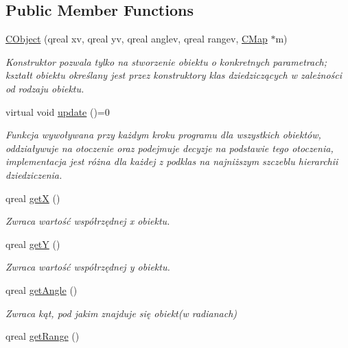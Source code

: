 \subsection*{Public Member Functions}
\begin{DoxyCompactItemize}
\item 
\mbox{\hyperlink{class_c_object_ab8bac765156b93002423cd43e853611f}{C\+Object}} (qreal xv, qreal yv, qreal anglev, qreal rangev, \mbox{\hyperlink{class_c_map}{C\+Map}} $\ast$m)
\begin{DoxyCompactList}\small\item\em Konstruktor pozwala tylko na stworzenie obiektu o konkretnych parametrach; kształt obiektu określany jest przez konstruktory klas dziedziczących w zależności od rodzaju obiektu. \end{DoxyCompactList}\item 
virtual void \mbox{\hyperlink{class_c_object_acb42ca516e836d0267ddb9a0556916a9}{update}} ()=0
\begin{DoxyCompactList}\small\item\em Funkcja wywoływana przy każdym kroku programu dla wszystkich obiektów, oddziaływuje na otoczenie oraz podejmuje decyzje na podstawie tego otoczenia, implementacja jest różna dla każdej z podklas na najniższym szczeblu hierarchii dziedziczenia. \end{DoxyCompactList}\item 
qreal \mbox{\hyperlink{class_c_object_a9199c97746518fd8eb029033d7539fbb}{getX}} ()
\begin{DoxyCompactList}\small\item\em Zwraca wartość współrzędnej x obiektu. \end{DoxyCompactList}\item 
qreal \mbox{\hyperlink{class_c_object_ac9ce72541d4420b65ec5abf7478f6e62}{getY}} ()
\begin{DoxyCompactList}\small\item\em Zwraca wartość współrzędnej y obiektu. \end{DoxyCompactList}\item 
qreal \mbox{\hyperlink{class_c_object_af1c8e71b2974e222f4b164f70dd7ffc4}{get\+Angle}} ()
\begin{DoxyCompactList}\small\item\em Zwraca kąt, pod jakim znajduje się obiekt(w radianach) \end{DoxyCompactList}\item 
qreal \mbox{\hyperlink{class_c_object_a8d0881ca2211266500a3d4af11cf8824}{get\+Range}} ()

\end{DoxyCompactItemize}
